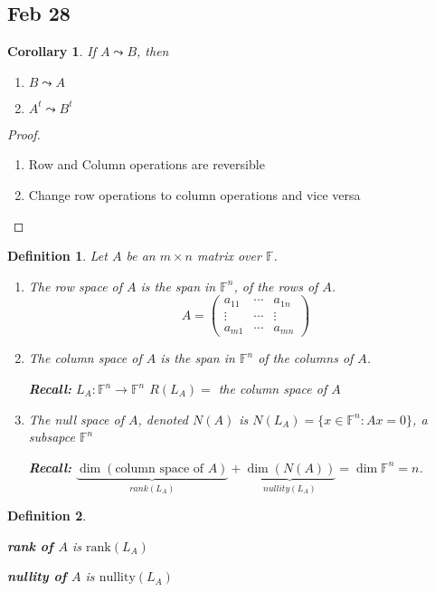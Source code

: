 \documentclass[12pt]{article}
\theoremstyle{plain}
\newtheorem{definition}{Definition}[subsection]
\newtheorem{corollary}{Corollary}[subsection]
\newcommand{\rank}{\mathrm{rank}}
\newcommand{\nullity}{\mathrm{nullity}}
\newcommand{\mF}{{\mathbb{F}}}
\begin{document}
\subsection{Feb 28}
\begin{corollary}
	If $A \leadsto B$, then
	\begin{enumerate}
		\item $B \leadsto A$ 
		\item $A^t \leadsto B^t$
	\end{enumerate}
\end{corollary}
\begin{proof}
	\begin{enumerate}
		\item Row and Column operations are reversible
		\item Change row operations to column operations and vice versa
	\end{enumerate}
\end{proof}

\begin{definition}
	Let $A$ be an $m \times n$ matrix over $\mF$. 
	\begin{enumerate}
		\item The row space of $A$ is the span in $\mF^n$, of the rows of $A$. 
		\[
			A = 
			\begin{pmatrix}
				a_{11} & \cdots & a_{1n}	\\
				\vdots & \cdots & \vdots	\\
				a_{m1} & \cdots & a_{mn}	
			\end{pmatrix}
		\]
		\item The column space of $A$ is the span in $\mF^n$ of the columns of
			$A$. 

			\textbf{Recall:} $L_A : \mF^n \to \mF^n$ $R(L_A) =$ the column 
			space of $A$ 

		\item The null space of $A$, denoted $N(A)$ is 
			$N(L_A) = \{x \in \mF^n: Ax = 0\}$, a subsapce $\mF^n$

			\textbf{Recall:} 
			$\underbrace{\dim(\text{column space of } A)}_{rank(L_A)}
			+ \underbrace{\dim(N(A))}_{nullity(L_A)} = \dim \mF^n = n$.  
	\end{enumerate}
\end{definition}

\begin{definition}
	\begin{description}
		\item \textbf{rank of $A$} is $\rank(L_A)$
		\item \textbf{nullity of $A$} is $\nullity(L_A)$
	\end{description}
\end{definition}
\end{document}
